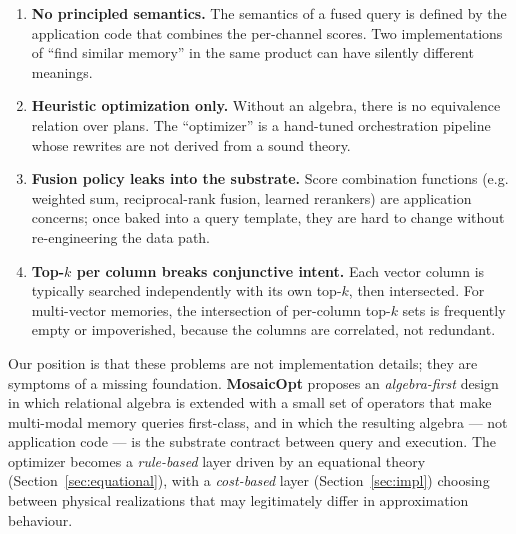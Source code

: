 \documentclass[acmsmall,review,anonymous]{acmart}
\theoremstyle{plain}
\theoremstyle{definition}
\theoremstyle{remark}
\begin{document}
\begin{enumerate}[leftmargin=*]
  \item \textbf{No principled semantics.} The semantics of a fused
    query is defined by the application code that combines the
    per-channel scores. Two implementations of ``find similar memory''
    in the same product can have silently different meanings.
  \item \textbf{Heuristic optimization only.} Without an algebra, there
    is no equivalence relation over plans. The ``optimizer'' is a
    hand-tuned orchestration pipeline whose rewrites are not derived
    from a sound theory.
  \item \textbf{Fusion policy leaks into the substrate.} Score
    combination functions (e.g. weighted sum, reciprocal-rank fusion,
    learned rerankers) are application concerns; once baked into a
    query template, they are hard to change without re-engineering the
    data path.
  \item \textbf{Top-$k$ per column breaks conjunctive intent.} Each
    vector column is typically searched independently with its own
    top-$k$, then intersected. For multi-vector memories, the
    intersection of per-column top-$k$ sets is frequently empty or
    impoverished, because the columns are correlated, not redundant.
\end{enumerate}

Our position is that these problems are not implementation details;
they are symptoms of a missing foundation. \textbf{MosaicOpt} proposes
an \emph{algebra-first} design in which relational algebra is extended
with a small set of operators that make multi-modal memory queries
first-class, and in which the resulting algebra --- not application
code --- is the substrate contract between query and execution. The
optimizer becomes a \emph{rule-based} layer driven by an equational
theory (Section~\ref{sec:equational}), with a
\emph{cost-based} layer (Section~\ref{sec:impl}) choosing between
physical realizations that may legitimately differ in approximation
behaviour.
\end{document}
